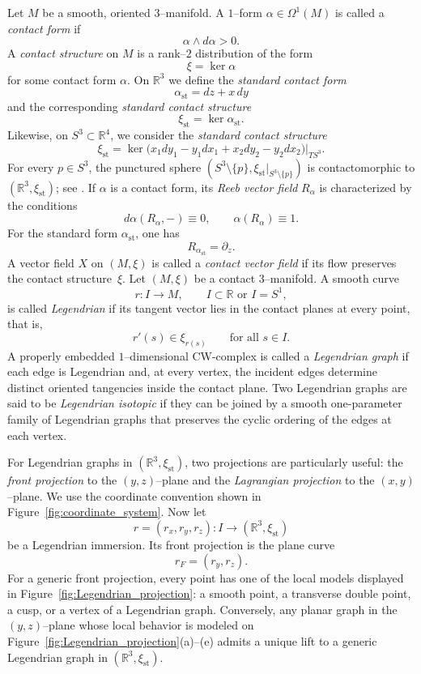 \documentclass{amsart}
\numberwithin{equation}{section}
\numberwithin{figure}{section}
\theoremstyle{definition}
\theoremstyle{remark}
\newcommand{\R}{\mathbb{R}}
\let\oldOmega\Omega
\renewcommand{\Omega}{\oldOmega}
\let\oldalpha\alpha %
\renewcommand{\alpha}{\oldalpha}
\newcommand{\alphast}{\oldalpha_{\mathrm{st}}}
\let\olddxi\xi %
\renewcommand{\xi}{\olddxi}
\newcommand{\xist}{\olddxi_{\mathrm{st}}}
\newcommand{\X}{X}
\begin{document}
Let $M$ be a smooth, oriented $3$--manifold. A $1$--form $\alpha\in\Omega^1(M)$ is called a \emph{contact form} if
\[
\alpha\wedge d\alpha>0.
\]
A \emph{contact structure} on $M$ is a rank--$2$ distribution of the form
\[
\xi=\ker\alpha
\]
for some contact form $\alpha$.
On $\R^3$ we define the \textit{standard contact form}
\[
\alphast = dz + x\,dy
\]
and the corresponding \textit{standard contact structure}
\[
\xist=\ker\alphast.
\]
Likewise, on $S^3\subset\R^4$, we consider the \textit{standard contact structure}
\[
\xist = \ker\bigl(x_1dy_1 - y_1dx_1 + x_2dy_2 - y_2dx_2\bigr)\big|_{TS^3}.
\]
For every $p\in S^3$, the punctured sphere $(S^3\setminus\{p\},\xist|_{S^3\setminus\{p\}})$ is contactomorphic to $(\R^3,\xist)$; see \cite[Proposition~2.1.8]{Geiges_book}.
If $\alpha$ is a contact form, its \emph{Reeb vector field} $R_\alpha$ is characterized by the conditions
\[
d\alpha(R_\alpha,-)\equiv 0,
\qquad
\alpha(R_\alpha)\equiv 1.
\]
For the standard form $\alphast$, one has
\[
R_{\alphast}=\partial_z.
\]
A vector field $\X$ on $(M,\xi)$ is called a \emph{contact vector field} if its flow preserves the contact structure~$\xi$.
Let $(M,\xi)$ be a contact $3$--manifold. A smooth curve
\[
r\colon I\longrightarrow M,
\qquad I\subset\R \text{ or } I=S^1,
\]
is called \emph{Legendrian} if its tangent vector lies in the contact planes at every point, that is,
\[
r'(s)\in \xi_{r(s)}
\qquad\text{for all }s\in I.
\]
A properly embedded $1$--dimensional CW-complex is called a \emph{Legendrian graph} if each edge is Legendrian and, at every vertex, the incident edges determine distinct oriented tangencies inside the contact plane. Two Legendrian graphs are said to be \emph{Legendrian isotopic} if they can be joined by a smooth one-parameter family of Legendrian graphs that preserves the cyclic ordering of the edges at each vertex.

For Legendrian graphs in $(\R^3,\xist)$, two projections are particularly useful: the \emph{front projection} to the $(y,z)$--plane and the \emph{Lagrangian projection} to the $(x,y)$--plane. We use the coordinate convention shown in Figure~\ref{fig:coordinate_system}.
Now let
\[
r=(r_x,r_y,r_z)\colon I\to(\R^3,\xist)
\]
be a Legendrian immersion. Its front projection is the plane curve
\[
r_F=(r_y,r_z).
\]
For a generic front projection, every point has one of the local models displayed in Figure~\ref{fig:Legendrian_projection}: a smooth point, a transverse double point, a cusp, or a vertex of a Legendrian graph. Conversely, any planar graph in the $(y,z)$--plane whose local behavior is modeled on Figure~\ref{fig:Legendrian_projection}(a)--(e) admits a unique lift to a generic Legendrian graph in $(\R^3,\xist)$.
\end{document}
